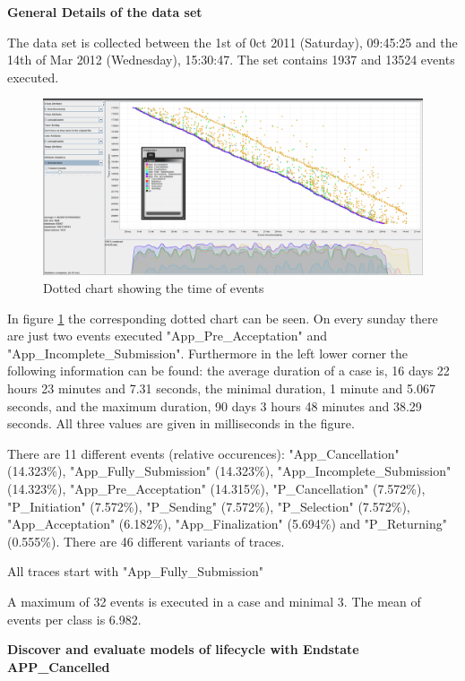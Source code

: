 \textbf{General Details of the data set}

The data set is collected between the 1st of 0ct 2011 (Saturday), 09:45:25 and the 14th of Mar 2012 (Wednesday), 15:30:47. The set contains 1937 and 13524 events executed. 

\begin{figure}[!htbp]
\centering
\includegraphics[height = 0.2\textheight]{CancDot.PNG}
\caption{Dotted chart showing the time of events}
\label{fig:CancTimeFlow}
\end{figure}

In figure \ref{fig:CancTimeFlow} the corresponding dotted chart can be seen. On every sunday there are just two events executed "App\_Pre\_Acceptation" and "App\_Incomplete\_Submission". Furthermore in the left lower corner the following information can be found: the average duration of a case is, 16 days 22 hours 23 minutes and 7.31 seconds, the minimal duration, 1 minute and 5.067 seconds, and the maximum duration, 90 days 3 hours 48 minutes and 38.29 seconds. All three values are given in milliseconds in the figure.

There are 11 different events (relative occurences):
"App\_Cancellation" (14.323\%), "App\_Fully\_Submission" (14.323\%), "App\_Incomplete\_Submission" (14.323\%), "App\_Pre\_Acceptation" (14.315\%), "P\_Cancellation" (7.572\%), "P\_Initiation" (7.572\%), "P\_Sending" (7.572\%), "P\_Selection" (7.572\%), "App\_Acceptation" (6.182\%), "App\_Finalization" (5.694\%) and "P\_Returning" (0.555\%). There are 46 different variants of traces.

All traces start with "App\_Fully\_Submission"

A maximum of 32 events is executed in a case and minimal 3. The mean of events per class is 6.982.


\textbf{Discover and evaluate models of lifecycle with Endstate APP\_Cancelled}

